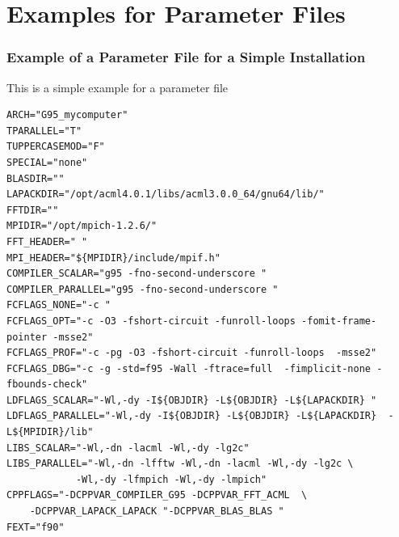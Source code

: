 \documentclass[a4paper,10pt]{report}
\begin{document}
\chapter{Examples for Parameter Files}
\label{sec:parmfiles}

\subsection{Example of a Parameter File for a Simple Installation}
\label{sec:parmfilesimple}
This is a simple example for a parameter file
\begin{verbatim}
ARCH="G95_mycomputer"
TPARALLEL="T"
TUPPERCASEMOD="F"
SPECIAL="none"
BLASDIR=""
LAPACKDIR="/opt/acml4.0.1/libs/acml3.0.0_64/gnu64/lib/"
FFTDIR=""     
MPIDIR="/opt/mpich-1.2.6/"
FFT_HEADER=" "   
MPI_HEADER="${MPIDIR}/include/mpif.h"
COMPILER_SCALAR="g95 -fno-second-underscore "
COMPILER_PARALLEL="g95 -fno-second-underscore "
FCFLAGS_NONE="-c "
FCFLAGS_OPT="-c -O3 -fshort-circuit -funroll-loops -fomit-frame-pointer -msse2"
FCFLAGS_PROF="-c -pg -O3 -fshort-circuit -funroll-loops  -msse2"
FCFLAGS_DBG="-c -g -std=f95 -Wall -ftrace=full  -fimplicit-none -fbounds-check"
LDFLAGS_SCALAR="-Wl,-dy -I${OBJDIR} -L${OBJDIR} -L${LAPACKDIR} "
LDFLAGS_PARALLEL="-Wl,-dy -I${OBJDIR} -L${OBJDIR} -L${LAPACKDIR}  -L${MPIDIR}/lib"
LIBS_SCALAR="-Wl,-dn -lacml -Wl,-dy -lg2c"
LIBS_PARALLEL="-Wl,-dn -lfftw -Wl,-dn -lacml -Wl,-dy -lg2c \
            -Wl,-dy -lfmpich -Wl,-dy -lmpich"
CPPFLAGS="-DCPPVAR_COMPILER_G95 -DCPPVAR_FFT_ACML  \
    -DCPPVAR_LAPACK_LAPACK "-DCPPVAR_BLAS_BLAS "
FEXT="f90"
\end{verbatim}

\newpage
\end{document}
